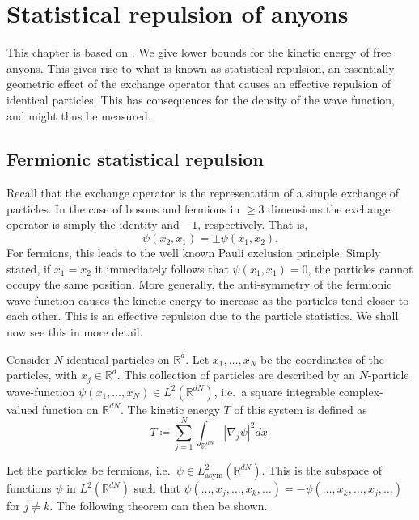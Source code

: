 
\chapter{Statistical repulsion of anyons}\label{chap:statistical repulsion}

This chapter is based on \cite{methmmp,lundholm-solovej,mancarella}. We give lower bounds for the kinetic energy of free anyons. This gives rise to what is known as statistical repulsion, an essentially geometric effect of the exchange operator that causes an effective repulsion of identical particles. This has consequences for the density of the wave function, and might thus be measured.


\section{Fermionic statistical repulsion}

Recall that the exchange operator is the representation of a simple exchange of particles. In the case of bosons and fermions in $\ge 3$ dimensions the exchange operator is simply the identity and $-1$, respectively. That is,
\begin{equation}
  \psi(x_2, x_1) = \pm \psi(x_1, x_2).
\end{equation}
For fermions, this leads to the well known Pauli exclusion principle. Simply stated, if $x_1 = x_2$ it immediately follows that $\psi(x_1, x_1) = 0$, the particles cannot occupy the same position. More generally, the anti-symmetry of the fermionic wave function causes the kinetic energy to increase as the particles tend closer to each other. This is an effective repulsion due to the particle statistics. We shall now see this in more detail.

Consider $N$ identical particles on $\mathbb{R}^d$. Let $x_1, \ldots, x_N$ be the coordinates of the particles, with $x_j \in \mathbb{R}^d$. This collection of particles are described by an $N$-particle wave-function $\psi(x_1, \ldots, x_N) \in L^2(\mathbb{R}^{dN})$, i.e.\ a square integrable complex-valued function on $\mathbb{R}^{dN}$. The kinetic energy $T$ of this system is defined as
\begin{equation}
  T \coloneqq \sum_{j=1}^N \int_{\mathbb{R}^{dN}} |\nabla_j \psi|^2 dx.
\end{equation}

Let the particles be fermions, i.e.\ $\psi \in L_\text{asym}^2(\mathbb{R}^{dN})$. This is the subspace of functions $\psi$ in $L^2(\mathbb{R}^{dN})$ such that $\psi(\ldots, x_j, \ldots, x_k, \ldots) = - \psi(\ldots, x_k, \ldots, x_j, \ldots)$ for $j \ne k$. The following theorem can then be shown. \cite{methmmp}

